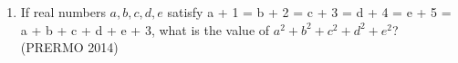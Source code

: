 \begin{enumerate}
\item If real numbers $a, b, c, d, e$ satisfy a + 1 = b + 2 = c + 3 = d + 4 = e + 5 = a + b + c + d + e + 3, what is the value of $a^2 + b^2 + c^2 + d^2 + e^2$?\hfill(PRERMO 2014)
\end{enumerate}
